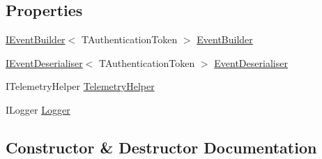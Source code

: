 \subsection*{Properties}
\begin{DoxyCompactItemize}
\item 
\hyperlink{interfaceCqrs_1_1Events_1_1IEventBuilder}{I\+Event\+Builder}$<$ T\+Authentication\+Token $>$ \hyperlink{classCqrs_1_1Events_1_1EventStore_a05393aedf2eae4b2eeae3977e7f1c6f9_a05393aedf2eae4b2eeae3977e7f1c6f9}{Event\+Builder}
\item 
\hyperlink{interfaceCqrs_1_1Events_1_1IEventDeserialiser}{I\+Event\+Deserialiser}$<$ T\+Authentication\+Token $>$ \hyperlink{classCqrs_1_1Events_1_1EventStore_a24f17302c069058e5814dedfb614d599_a24f17302c069058e5814dedfb614d599}{Event\+Deserialiser}
\item 
I\+Telemetry\+Helper \hyperlink{classCqrs_1_1Events_1_1EventStore_a75d6d3ad3a26fb9b511e2a98e72260f9_a75d6d3ad3a26fb9b511e2a98e72260f9}{Telemetry\+Helper}
\item 
I\+Logger \hyperlink{classCqrs_1_1Events_1_1EventStore_a99506f7136a658364f8b74ef6a779a3f_a99506f7136a658364f8b74ef6a779a3f}{Logger}
\end{DoxyCompactItemize}


\subsection{Constructor \& Destructor Documentation}
\mbox{\label{classCqrs_1_1Events_1_1EventStore_a6346cb2aea4c5b4e740dc6cfb15abab8_a6346cb2aea4c5b4e740dc6cfb15abab8}} 
